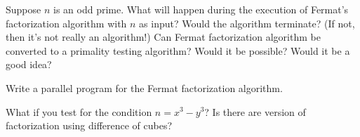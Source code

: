 \begin{ex}
  Suppose $n$ is an odd prime. 
  What will happen during the execution of Fermat's factorization algorithm with $n$ as input?
  Would the algorithm terminate? (If not, then it's not really an algorithm!)
  Can Fermat factorization algorithm be converted to a primality testing algorithm?
  Would it be possible? Would it be a good idea?
\end{ex}

\begin{comment}
  It would terminate when $x = (p + 1)/2$ and $y = (p - 1)/2$
  so that $x - y = 1$, $x + y = p$, i.e., we get the factorization $n = 1 \times n$.

  In this case $x$ starts at around $\sqrt{p} + 1$ and reaches $(p + 1)/2$,
  roughly from $\sqrt{p}$ to $p/2$.
  For instance if $p$ is about $10000$, then $p$ runs from $100$ to $5000$, i.e.,
  $4900$ integers.
  Brute force test for primeness runs from $2$ to $\sqrt{p}$ which in this case if $2$ to $100$.
  Therefore Fermat Factorization would be a very bad prime testing algorithm.
\end{comment}






\begin{ex}
  Write a parallel program for the Fermat factorization algorithm.
\end{ex}


\begin{ex}
  What if you test for the condition $n = x^3 - y^3$?
  Is there are version of
  factorization using difference of cubes?
\end{ex}
